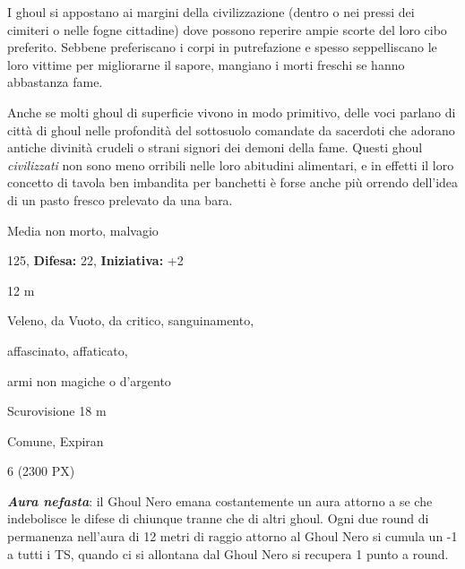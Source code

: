 \begin{multicols}{2}
{I ghoul si appostano ai margini della civilizzazione (dentro o nei pressi dei cimiteri o nelle fogne cittadine) dove possono reperire ampie scorte del loro cibo preferito. Sebbene preferiscano i corpi in putrefazione e spesso seppelliscano le loro vittime per migliorarne il sapore, mangiano i morti freschi se hanno abbastanza fame.

Anche se molti ghoul di superficie vivono in modo primitivo, delle voci parlano di città di ghoul nelle profondità del sottosuolo comandate da sacerdoti che adorano antiche divinità crudeli o strani signori dei demoni della fame. Questi ghoul \emph{civilizzati} non sono meno orribili nelle loro abitudini alimentari, e in effetti il loro concetto di tavola ben imbandita per banchetti è forse anche più orrendo dell'idea di un pasto fresco prelevato da una bara.

\noindent
\begin{description}[noitemsep, topsep=0pt, parsep=0pt, partopsep=0pt, leftmargin=0cm, labelwidth=2.2cm]
	\item[\textbf{Taglia/Tipo:}] Media non morto, malvagio
	\item[\textbf{Caratt.:}] 
	\item[\textbf{Punti Ferita:}] 125,  \textbf{Difesa:} 22,  \textbf{Iniziativa:} +2
	\item[\textbf{Movimento:}] 12 m
	\item[\textbf{Tiri Salvez.:}] 
	\item[\textbf{Imm. Danni:}] Veleno, da Vuoto, da critico, sanguinamento,
	\item[\textbf{Immunità:}] affascinato, affaticato,
	\item[\textbf{Res. Danni:}] armi non magiche o d'argento
	\item[\textbf{Sensi:}] Scurovisione 18 m
	\item[\textbf{Linguaggi:}] Comune, Expiran
	\item[\textbf{Sfida:}] 6 (2300 PX)\smallskip
\end{description}

\textbf{\emph{Aura nefasta}}: il Ghoul Nero emana costantemente un aura attorno a se che indebolisce le difese di chiunque tranne che di altri ghoul. Ogni due round di permanenza nell'aura di 12 metri di raggio attorno al Ghoul Nero si cumula un -1 a tutti i TS, quando ci si allontana dal Ghoul Nero si recupera 1 punto a round.

}
\end{multicols}
